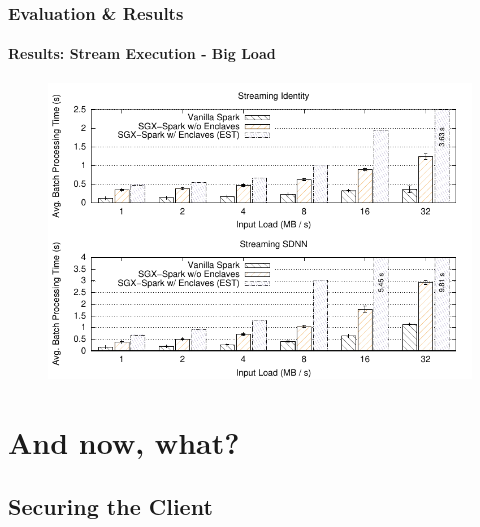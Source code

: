 \documentclass[10pt,    %
    english,            %
    xcolor=table,       %
    envcountsect,        %
    aspectratio=169     %
]{beamer}
\begin{document}
\begin{frame}
    \frametitle{Evaluation \& Results}
    \framesubtitle{Results: Stream Execution - Big Load}

    \vspace{-15pt}

    \begin{figure}[T]
        \centering
        \includegraphics[width=.7\textwidth]{plots/big_throughput.pdf}
    \end{figure}

\end{frame}

\section{And now, what?}
\label{sec:medspark}
\sectionframe

\subsection{Securing the Client}
\end{document}
